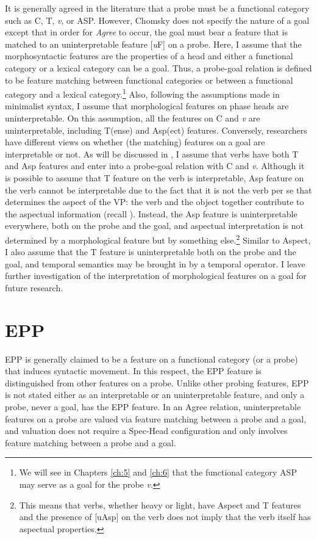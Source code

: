 \newpage
It is generally agreed in the literature that a probe must be a functional category such as C, T, \textit{v}, or \ac{ASP}. However, Chomsky does not specify the nature of a goal except that in order for \textit{Agree} to occur, the goal must bear a feature that is matched to an uninterpretable feature [\textit{u}F] on a probe. Here, I assume that the morphosyntactic features are the properties of a head and either a functional category or a lexical category can be a goal. Thus, a probe-goal relation is defined to be feature matching between functional categories or between a functional category and a lexical category.\footnote{We will see in Chapters \ref{ch:5} and \ref{ch:6} that the functional category \ac{ASP} may serve as a goal for the probe \textit{v}.} Also, following the assumptions made in minimalist syntax, I assume that morphological features on phase heads are uninterpretable. On this assumption, all the features on C and \textit{v} are uninterpretable, including T(ense) and Asp(ect) features. Conversely, researchers have different views on whether (the matching) features on a goal are interpretable or not. As will be discussed in , I assume that verbs have both T and Asp features and enter into a probe-goal relation with C and \textit{v}. Although it is possible to assume that T feature on the verb is interpretable, Asp feature on the verb cannot be interpretable due to the fact that it is not the verb per se that determines the aspect of the \ac{VP}: the verb and the object together contribute to the aspectual information (recall ). Instead, the Asp feature is uninterpretable everywhere, both on the probe and the goal, and aspectual interpretation is not determined by a morphological feature but by something else.\footnote{This means that verbs, whether heavy or light, have Aspect and T features and the presence of [uAsp] on the verb does not imply that the verb itself has aspectual properties.} Similar to Aspect, I also assume that the T feature is uninterpretable both on the probe and the goal, and temporal semantics may be brought in by a temporal operator. I leave further investigation of the interpretation of morphological features on a goal for future research. 

\section{EPP}\label{ch4:sectio:4.3}  

\ac{EPP} is generally claimed to be a feature on a functional category (or a probe) that induces syntactic movement. In this respect, the \ac{EPP} feature is distinguished from other features on a probe. Unlike other probing features, \ac{EPP} is not stated either as an interpretable or an uninterpretable feature, and only a probe, never a goal, has the \ac{EPP} feature. In an Agree relation, uninterpretable features on a probe are valued via feature matching between a probe and a goal, and valuation does not require a Spec-Head configuration and only involves feature matching between a probe and a goal.

